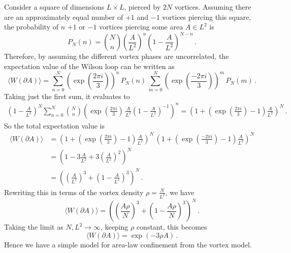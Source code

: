 \documentclass{article}
\begin{document}
Consider a square of dimensions $L\times L$, pierced by $2N$ vortices. Assuming there are an approximately equal number of $+1$ and $-1$ vortices piercing this square, the probability of $n$ $+1$ or $-1$ vortices piercing some area $A \in L^2$ is
\begin{equation}
P_N(n) = {N\choose n} \left(\frac{A}{L^2}\right)^n \left(1-\frac{A}{L^2}\right)^{N-n}\, .
\end{equation}
Therefore, by assuming the different vortex phases are uncorrelated, the expectation value of the Wilson loop can be written as
\begin{equation}
\langle W(\partial A)\rangle = \sum_{n=0}^N \left(\exp\left(\frac{2\pi i}{3}\right)\right)^n\,P_{N}(n)\,\sum_{m=0}^{N}\left(\exp\left(\frac{-2\pi i}{3}\right)\right)^m\,P_{N}(m)\, .
\end{equation}
Taking just the first sum, it evaluates to
\begin{align*}
\left(1-\frac{A}{L^2}\right)^{N}\sum_{n=0}^{N} {N\choose n} \left(\exp\left(\frac{2\pi i}{3}\right)\,\frac{A}{L^2}\left(1-\frac{A}{L^2}\right)^{-1}\right)^n=\left(1+\left(\exp\left(\frac{2\pi i}{3}\right) - 1\right)\frac{A}{L^2}\right)^N\, . 
\end{align*}
So the total expectation value is
\begin{align*}
\langle W(\partial A)\rangle &=\left(1+\left(\exp\left(\frac{2\pi i}{3}\right) - 1\right)\frac{A}{L^2}\right)^N\, \left(1+\left(\exp\left(\frac{-2\pi i}{3}\right) - 1\right)\frac{A}{L^2}\right)^N\\
&=\left(1 -3\frac{A}{L^2} + 3\left(\frac{A}{L^2}\right)^2\right)^N\\
&= \left(\left(\frac{A}{L^2}\right)^3+\left(1-\frac{A}{L^2}\right)^3\right)^N\, .
\end{align*}
Rewriting this in terms of the vortex density $\rho = \frac{N}{L^2}$, we have
\begin{equation}
\langle W(\partial A)\rangle = \left(\left(\frac{A\rho}{N}\right)^3+\left(1-\frac{A\rho}{N}\right)^3\right)^N\, .
\end{equation}
Taking the limit as $N,L^2\rightarrow\infty$, keeping $\rho$ constant, this becomes
\begin{equation}
\langle W(\partial A)\rangle = \exp(-3\rho A)\, .
\end{equation}
Hence we have a simple model for area-law confinement from the vortex model.
\end{document}
